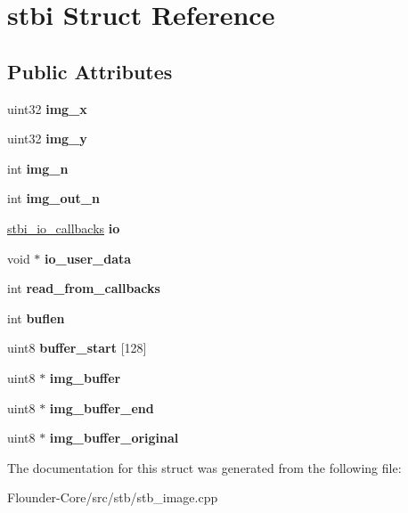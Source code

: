 \hypertarget{structstbi}{}\section{stbi Struct Reference}
\label{structstbi}
\subsection*{Public Attributes}
\begin{DoxyCompactItemize}
\item 
\mbox{\label{structstbi_af3b42c257fb0d8896f29ca3921540a42}} 
uint32 {\bfseries img\+\_\+x}
\item 
\mbox{\label{structstbi_a60cb5a630e268b2d12306c6eca246dd1}} 
uint32 {\bfseries img\+\_\+y}
\item 
\mbox{\label{structstbi_ae22cfcc23f5ab67bede22942333ecbd7}} 
int {\bfseries img\+\_\+n}
\item 
\mbox{\label{structstbi_a33f6519d8f99b84afbde795dc7a931f2}} 
int {\bfseries img\+\_\+out\+\_\+n}
\item 
\mbox{\label{structstbi_a86596e1eb2b0f57a60a18777bd37ff53}} 
\hyperlink{structstbi__io__callbacks}{stbi\+\_\+io\+\_\+callbacks} {\bfseries io}
\item 
\mbox{\label{structstbi_a9838a0c89630f283c25a16f4e30f40aa}} 
void $\ast$ {\bfseries io\+\_\+user\+\_\+data}
\item 
\mbox{\label{structstbi_acb201cc1b3eb134f342cee89f5d11e70}} 
int {\bfseries read\+\_\+from\+\_\+callbacks}
\item 
\mbox{\label{structstbi_a76d6f761529ecff7f02469b19371af0e}} 
int {\bfseries buflen}
\item 
\mbox{\label{structstbi_af99edda496281a6ca1b58271cabdbc69}} 
uint8 {\bfseries buffer\+\_\+start} \mbox{[}128\mbox{]}
\item 
\mbox{\label{structstbi_aace36d5487a596bea5faa0aef0398ac8}} 
uint8 $\ast$ {\bfseries img\+\_\+buffer}
\item 
\mbox{\label{structstbi_a55f78565e605f1784d47fc9acea475f3}} 
uint8 $\ast$ {\bfseries img\+\_\+buffer\+\_\+end}
\item 
\mbox{\label{structstbi_a261be6edda817862e623972b21b4f965}} 
uint8 $\ast$ {\bfseries img\+\_\+buffer\+\_\+original}
\end{DoxyCompactItemize}


The documentation for this struct was generated from the following file\+:\begin{DoxyCompactItemize}
\item 
Flounder-\/\+Core/src/stb/stb\+\_\+image.\+cpp\end{DoxyCompactItemize}
